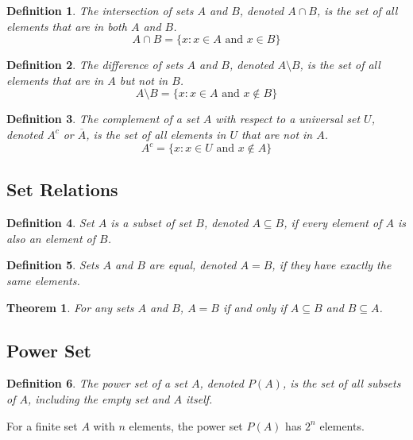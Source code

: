 \documentclass[12pt,a4paper]{article}
\newtheorem{definition}{Definition}
\newtheorem{theorem}{Theorem}
\begin{document}
\begin{definition}
The intersection of sets $A$ and $B$, denoted $A \cap B$, is the set of all elements that are in both $A$ and $B$.
\[ A \cap B = \{x : x \in A \text{ and } x \in B\} \]
\end{definition}

\begin{definition}
The difference of sets $A$ and $B$, denoted $A \setminus B$, is the set of all elements that are in $A$ but not in $B$.
\[ A \setminus B = \{x : x \in A \text{ and } x \notin B\} \]
\end{definition}

\begin{definition}
The complement of a set $A$ with respect to a universal set $U$, denoted $A^c$ or $\overline{A}$, is the set of all elements in $U$ that are not in $A$.
\[ A^c = \{x : x \in U \text{ and } x \notin A\} \]
\end{definition}

\subsection{Set Relations}

\begin{definition}
Set $A$ is a subset of set $B$, denoted $A \subseteq B$, if every element of $A$ is also an element of $B$.
\end{definition}

\begin{definition}
Sets $A$ and $B$ are equal, denoted $A = B$, if they have exactly the same elements.
\end{definition}

\begin{theorem}
For any sets $A$ and $B$, $A = B$ if and only if $A \subseteq B$ and $B \subseteq A$.
\end{theorem}

\subsection{Power Set}

\begin{definition}
The power set of a set $A$, denoted $P(A)$, is the set of all subsets of $A$, including the empty set and $A$ itself.
\end{definition}

For a finite set $A$ with $n$ elements, the power set $P(A)$ has $2^n$ elements.
\end{document}
